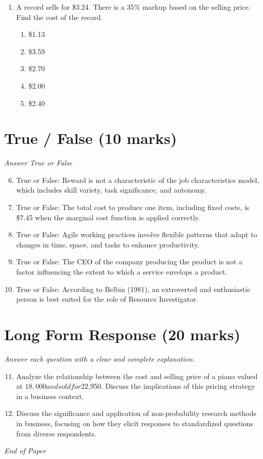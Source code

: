 \documentclass[12pt]{article}
\begin{document}
\begin{enumerate}[label=\arabic*.]
\begin{enumerate}[label=(\alph*)]
    \item \$14.95
    \item \$15.95
    \item \$16.00
    \item \$14.50
    \item \$15.05
\end{enumerate}
\item A record sells for \$3.24. There is a 35\% markup based on the selling price. Find the cost of the record.
\begin{enumerate}[label=(\alph*)]
    \item \$1.13
    \item \$3.59
    \item \$2.70
    \item \$2.00
    \item \$2.40
\end{enumerate}
\end{enumerate}

\section*{True / False (10 marks)}
\textit{Answer True or False}
\begin{enumerate}[label=\arabic*.]
\setcounter{enumi}{5}
\item True or False: Reward is not a characteristic of the job characteristics model, which includes skill variety, task significance, and autonomy.
\item True or False: The total cost to produce one item, including fixed costs, is \$7.45 when the marginal cost function is applied correctly.
\item True or False: Agile working practices involve flexible patterns that adapt to changes in time, space, and tasks to enhance productivity.
\item True or False: The CEO of the company producing the product is not a factor influencing the extent to which a service envelops a product.
\item True or False: According to Belbin (1981), an extroverted and enthusiastic person is best suited for the role of Resource Investigator.
\end{enumerate}

\section*{Long Form Response (20 marks)}
\textit{Answer each question with a clear and complete explanation.}
\begin{enumerate}[label=\arabic*.]
\setcounter{enumi}{10}
\item Analyze the relationship between the cost and selling price of a piano valued at $18,000 and sold for $22,950. Discuss the implications of this pricing strategy in a business context.
\item Discuss the significance and application of non-probability research methods in business, focusing on how they elicit responses to standardized questions from diverse respondents.
\end{enumerate}

\vfill
\noindent\textit{End of Paper}
\end{document}
